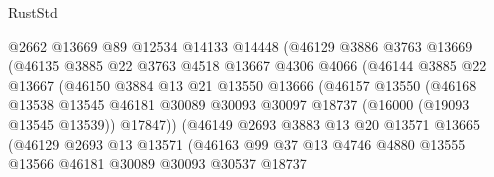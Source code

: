 \begin{lexlean}{RustStd}
\begin{coremodule}
                          @2662
                          @13669
                          @89
                          @12534
                          @14133
                          @14448
                          (@46129
                            @3886
                            @3763
                            @13669
                            (@46135
                              @3885
                              @22
                              @3763
                              @4518
                              @13667
                              @4306
                              @4066
                              (@46144
                                @3885
                                @22
                                @13667
                                (@46150
                                  @3884
                                  @13
                                  @21
                                  @13550
                                  @13666
                                  (@46157
                                    @13550
                                    (@46168
                                      @13538
                                      @13545
                                      @46181
                                      @30089
                                      @30093
                                      @30097
                                      @18737
                                      (@16000 (@19093 @13545 @13539))
                                      @17847))
                                  (@46149
                                    @2693
                                    @3883
                                    @13
                                    @20
                                    @13571
                                    @13665
                                    (@46129
                                      @2693
                                      @13
                                      @13571
                                      (@46163
                                        @99
                                        @37
                                        @13
                                        @4746
                                        @4880
                                        @13555
                                        @13566
                                        @46181
                                        @30089
                                        @30093
                                        @30537
                                        @18737

\end{coremodule}
\end{lexlean}
